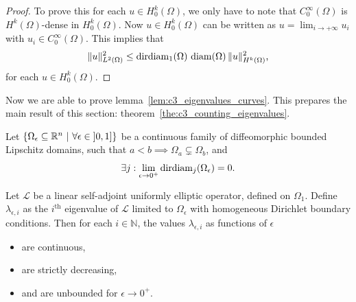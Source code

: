 \begin{proof}
  To prove this for each $u \in H_0^k(\Omega)$, we only have to note that
  $C^\infty_0(\Omega)$ is $H^k(\Omega)$-dense in $H^k_0(\Omega)$. Now $u \in H_0^k(\Omega)$ can be written as $u = \lim_{i \to +\infty} u_i$ with $u_i \in C^\infty_0(\Omega)$. This implies that
  $$\|u\|_{L^2(\Omega)}^2 \leq \operatorname{dirdiam}_1(\Omega) \, \operatorname{diam}(\Omega) \, \| u \|^2_{H^k(\Omega)}\text{,}$$
  for each $u \in H_0^k(\Omega)$.
\end{proof}

Now we are able to prove lemma~\ref{lem:c3_eigenvalues_curves}. This prepares the main result of this section: theorem~\ref{the:c3_counting_eigenvalues}.

\begin{lemma}\label{lem:c3_eigenvalues_curves}
  Let $\left\{\Omega_\epsilon \subseteq \RR^n \ | \ \forall \epsilon \in \left]0, 1\right]\right\}$ be a continuous family of diffeomorphic bounded Lipschitz domains, such that $ a < b \implies \Omega_a \subsetneq \Omega_b $, and
  $$
    \exists j : \lim_{\epsilon \to 0^{+}} \operatorname{dirdiam}_j(\Omega_\epsilon) = 0\text{.}
  $$

  Let $\mathcal{L}$ be a linear self-adjoint uniformly elliptic operator, defined on $\Omega_1$. Define $\lambda_{\epsilon,i}$ as the $i^\text{th}$ eigenvalue of $\mathcal{L}$ limited to $\Omega_\epsilon$ with homogeneous Dirichlet boundary conditions. Then for each $i \in \mathbb{N}$, the values $\lambda_{\epsilon,i}$ as functions of $\epsilon$
  \begin{itemize}
    \item are continuous,
    \item are strictly decreasing,
    \item and are unbounded for $\epsilon \to 0^{+}$.
  \end{itemize}
\end{lemma}
